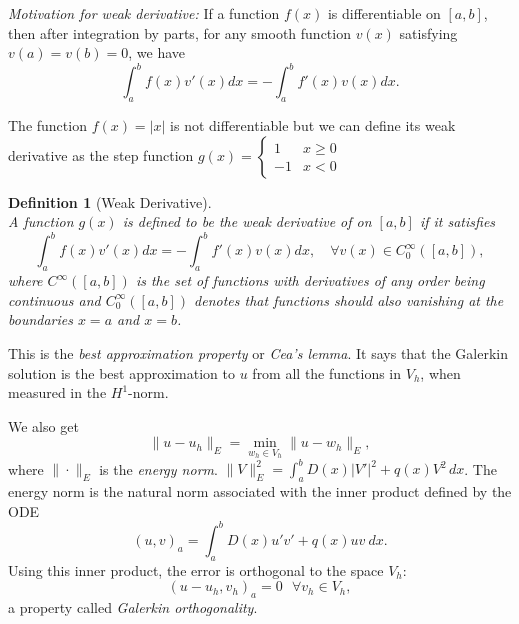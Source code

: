 \documentclass[12pt, a4paper]{article}
\newtheorem{definition}[thm]{Definition}
\theoremstyle{definition}
\theoremstyle{remark}
\numberwithin{equation}{section}
\begin{document}
{\it Motivation for weak derivative:} If a function $f(x)$ is differentiable on $[a,b]$,  then after integration by parts, for any smooth function $v(x)$ satisfying $v(a)=v(b)=0$, we have
\begin{equation*}
		\int_a^bf(x)v'(x)dx = -\int_a^bf'(x)v(x)dx.
\end{equation*}

The function $f(x)=|x|$ is not differentiable but we can define its weak derivative as the step function 
$g(x) = \left\{\begin{array}{cl}
	1& x\ge 0 \\
	-1& x< 0
\end{array}\right.
$



\begin{definition}[Weak Derivative] \ \\
A function $g(x)$ is defined to be the weak derivative of  on $[a,b]$ if it satisfies
\begin{equation*}
		\int_a^bf(x)v'(x)dx = -\int_a^bf'(x)v(x)dx, \quad \forall v(x)\in C_0^{\infty}([a,b]),
\end{equation*}
where $C^{\infty}([a,b])$ is the set of functions with derivatives of any order being continuous and $C_0^{\infty}([a,b])$ denotes that functions should also vanishing at the boundaries $x=a$ and $x=b$.
\end{definition} 



This is the \emph{best approximation property} or \emph{Cea's lemma}. It says that the Galerkin solution is the best approximation to $u$ from all the functions in $V_h$, 
when measured in the $H^1$-norm. 

We also get 
\begin{equation*}
\|u-u_h\|_E =  \min\limits_{w_h\in V_h} \|u-w_{h}\|_E,
\end{equation*}
where  $\| \cdot \|_E$ is the \emph{energy norm}. $\|V\|_E^2=\int_a^b D(x) |V'|^2 + q(x) V^2\,dx$.
The energy norm is the natural norm associated with the inner product defined by the ODE
\begin{equation*}
(u,v)_a= \int_a^b D(x) u' v' + q(x) u v \  dx.
\end{equation*}
Using this inner product, the error is orthogonal to the space $V_h$:
\begin{equation*}
(u-u_h,v_h)_a=0  \ \ \   \forall v_h \in V_h,
\end{equation*}
a property called \emph{Galerkin orthogonality}.
\end{document}
